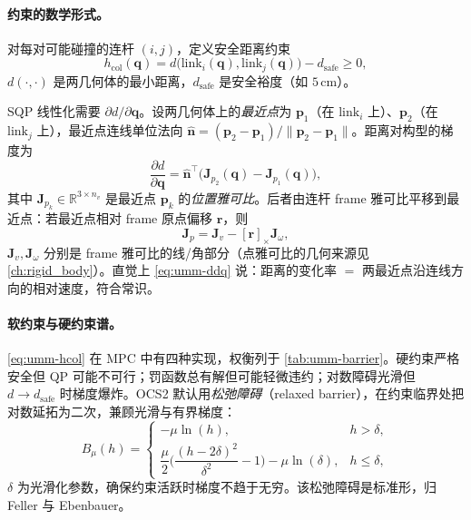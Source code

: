 \paragraph{约束的数学形式。}
对每对可能碰撞的连杆 $(i,j)$，定义安全距离约束
\begin{equation}
  h_{\text{col}}(\mathbf q)=d\big(\mathrm{link}_i(\mathbf q),\mathrm{link}_j(\mathbf q)\big)-d_{\text{safe}}\ge0,
  \label{eq:umm-hcol}
\end{equation}
$d(\cdot,\cdot)$ 是两几何体的最小距离，$d_{\text{safe}}$ 是安全裕度（如 $5\,\mathrm{cm}$）。

\begin{derivation}[距离梯度的解析式]
SQP 线性化需要 $\partial d/\partial\mathbf q$。设两几何体上的\emph{最近点}为 $\mathbf p_1$（在 $\mathrm{link}_i$ 上）、$\mathbf p_2$（在 $\mathrm{link}_j$ 上），最近点连线单位法向 $\hat{\mathbf n}=(\mathbf p_2-\mathbf p_1)/\|\mathbf p_2-\mathbf p_1\|$。距离对构型的梯度为
\begin{equation}
  \frac{\partial d}{\partial\mathbf q}=\hat{\mathbf n}^\top\big(\mathbf J_{p_2}(\mathbf q)-\mathbf J_{p_1}(\mathbf q)\big),
  \label{eq:umm-ddq}
\end{equation}
其中 $\mathbf J_{p_k}\in\mathbb R^{3\times n_v}$ 是最近点 $\mathbf p_k$ 的\emph{位置雅可比}。后者由连杆 frame 雅可比平移到最近点：若最近点相对 frame 原点偏移 $\mathbf r$，则
\begin{equation}
  \mathbf J_{p}=\mathbf J_v-[\mathbf r]_\times\mathbf J_\omega,
  \label{eq:umm-Jp}
\end{equation}
$\mathbf J_v,\mathbf J_\omega$ 分别是 frame 雅可比的线/角部分（点雅可比的几何来源见 \cref{ch:rigid_body}）。直觉上 \cref{eq:umm-ddq} 说：距离的变化率 $=$ 两最近点沿连线方向的相对速度，符合常识。
\end{derivation}

\paragraph{软约束与硬约束谱。}
\cref{eq:umm-hcol} 在 MPC 中有四种实现，权衡列于 \cref{tab:umm-barrier}。硬约束严格安全但 QP 可能不可行；罚函数总有解但可能轻微违约；对数障碍光滑但 $d\to d_{\text{safe}}$ 时梯度爆炸。OCS2 默认用\emph{松弛障碍}（relaxed barrier），在约束临界处把对数延拓为二次，兼顾光滑与有界梯度：
\begin{equation}
  B_\mu(h)=\begin{cases}
  -\mu\ln(h), & h>\delta,\\[3pt]
  \dfrac{\mu}{2}\Big(\dfrac{(h-2\delta)^2}{\delta^2}-1\Big)-\mu\ln(\delta), & h\le\delta,
  \end{cases}
  \label{eq:umm-relaxed}
\end{equation}
$\delta$ 为光滑化参数，确保约束活跃时梯度不趋于无穷。该松弛障碍是标准形，归 Feller 与 Ebenbauer\cite{feller2017relaxed}。

